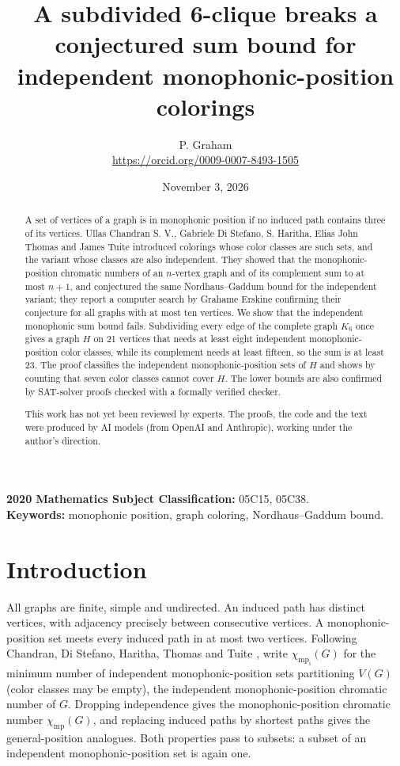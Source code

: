 \documentclass[11pt]{article}
\title{A subdivided 6-clique breaks a conjectured sum bound for
independent monophonic-position colorings}
\author{P. Graham\\ \small\url{https://orcid.org/0009-0007-8493-1505}}
\date{November 3, 2026}
\theoremstyle{remark}
\newcommand{\chimp}{\chi_{\mathrm{mp}_{\mathrm{i}}}}
\begin{document}
\maketitle
\begin{abstract}
A set of vertices of a graph is in monophonic position if no induced path
contains three of its vertices. Ullas Chandran S. V., Gabriele Di Stefano,
S. Haritha, Elias John Thomas and James Tuite introduced colorings whose
color classes are such sets, and the variant whose classes are also
independent. They showed that the monophonic-position chromatic numbers of
an $n$-vertex graph and of its complement sum to at most $n+1$, and
conjectured the same Nordhaus--Gaddum bound for the independent variant;
they report a computer search by Grahame Erskine confirming their
conjecture for all graphs with at most ten vertices. We show that the
independent monophonic sum bound fails. Subdividing every edge of the
complete graph $K_6$ once gives a graph $H$ on 21 vertices that needs at
least eight independent monophonic-position color classes, while its
complement needs at least fifteen, so the sum is at least 23. The proof
classifies the independent monophonic-position sets of $H$ and shows by
counting that seven color classes cannot cover $H$. The lower bounds are
also confirmed by SAT-solver proofs checked with a formally verified
checker.

This work has not yet been reviewed by experts.
The proofs, the code and the text were produced by AI models (from OpenAI
and Anthropic), working under the author's direction.
\end{abstract}
\medskip
\noindent\textbf{2020 Mathematics Subject Classification:} 05C15, 05C38.\\
\textbf{Keywords:} monophonic position, graph coloring, Nordhaus--Gaddum bound.

\section{Introduction}
All graphs are finite, simple and undirected. An induced path has distinct
vertices, with adjacency precisely between consecutive vertices. A
monophonic-position set meets every induced path in at most two vertices.
Following Chandran, Di Stefano, Haritha, Thomas and Tuite
\cite[Definition 2.3]{position}, write $\chimp(G)$ for the minimum number
of independent monophonic-position sets partitioning $V(G)$ (color
classes may be empty), the independent monophonic-position chromatic
number of $G$. Dropping independence gives the monophonic-position
chromatic number $\chi_{\mathrm{mp}}(G)$, and replacing induced paths by
shortest paths gives the general-position analogues. Both properties
pass to subsets: a subset of an independent monophonic-position set is
again one.
\end{document}
